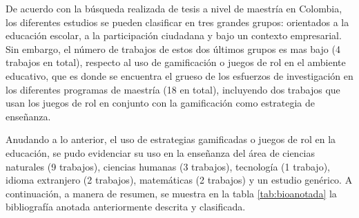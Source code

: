 De acuerdo con la búsqueda realizada de tesis a nivel de maestría en Colombia, los diferentes estudios se 
pueden clasificar en tres grandes grupos: orientados a la educación escolar, a la participación ciudadana y 
bajo un contexto empresarial. Sin embargo, el número de trabajos de estos dos últimos grupos es mas bajo (4 
trabajos en total), respecto al uso de gamificación o juegos de rol en el ambiente educativo, que es donde se 
encuentra el grueso de los esfuerzos de investigación en los diferentes programas de maestría (18 en total), 
incluyendo dos trabajos que usan los juegos de rol en conjunto con la gamificación como estrategia de 
enseñanza.

Anudando a lo anterior, el uso de estrategias gamificadas o juegos de rol en la educación, se pudo evidenciar
su uso en la enseñanza del área de ciencias naturales (9 trabajos), ciencias humanas (3 trabajos), tecnología 
(1 trabajo), idioma extranjero (2 trabajos), matemáticas (2 trabajos) y un estudio genérico. A continuación, a 
manera de resumen, se muestra en la tabla \ref{tab:bioanotada} la bibliografía anotada anteriormente descrita 
y clasificada.

